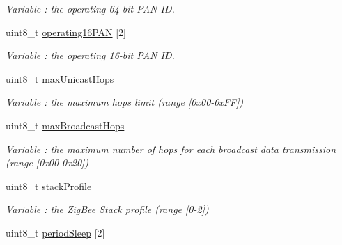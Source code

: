 \begin{DoxyCompactItemize}
\begin{DoxyCompactList}\small\item\em Variable \+: the operating 64-\/bit P\+AN ID. \end{DoxyCompactList}\item 
uint8\+\_\+t \hyperlink{class_wasp_x_bee_z_b_a0decfdb006b7e29f75a3ded83ab13ae5}{operating16\+P\+AN} \mbox{[}2\mbox{]}\hypertarget{class_wasp_x_bee_z_b_a0decfdb006b7e29f75a3ded83ab13ae5}{}\label{class_wasp_x_bee_z_b_a0decfdb006b7e29f75a3ded83ab13ae5}

\begin{DoxyCompactList}\small\item\em Variable \+: the operating 16-\/bit P\+AN ID. \end{DoxyCompactList}\item 
uint8\+\_\+t \hyperlink{class_wasp_x_bee_z_b_ab1c10f4df0c97332255921cff2fdc9b1}{max\+Unicast\+Hops}\hypertarget{class_wasp_x_bee_z_b_ab1c10f4df0c97332255921cff2fdc9b1}{}\label{class_wasp_x_bee_z_b_ab1c10f4df0c97332255921cff2fdc9b1}

\begin{DoxyCompactList}\small\item\em Variable \+: the maximum hops limit (range \mbox{[}0x00-\/0x\+FF\mbox{]}) \end{DoxyCompactList}\item 
uint8\+\_\+t \hyperlink{class_wasp_x_bee_z_b_ab61d6af1c2ccf7369189697a0d567e6a}{max\+Broadcast\+Hops}\hypertarget{class_wasp_x_bee_z_b_ab61d6af1c2ccf7369189697a0d567e6a}{}\label{class_wasp_x_bee_z_b_ab61d6af1c2ccf7369189697a0d567e6a}

\begin{DoxyCompactList}\small\item\em Variable \+: the maximum number of hops for each broadcast data transmission (range \mbox{[}0x00-\/0x20\mbox{]}) \end{DoxyCompactList}\item 
uint8\+\_\+t \hyperlink{class_wasp_x_bee_z_b_a2ac5bf30f23d32970edc8aa9432a30d5}{stack\+Profile}\hypertarget{class_wasp_x_bee_z_b_a2ac5bf30f23d32970edc8aa9432a30d5}{}\label{class_wasp_x_bee_z_b_a2ac5bf30f23d32970edc8aa9432a30d5}

\begin{DoxyCompactList}\small\item\em Variable \+: the Zig\+Bee Stack profile (range \mbox{[}0-\/2\mbox{]}) \end{DoxyCompactList}\item 
uint8\+\_\+t \hyperlink{class_wasp_x_bee_z_b_aa552043b10f91a20d7188b51f3fd90a3}{period\+Sleep} \mbox{[}2\mbox{]}\hypertarget{class_wasp_x_bee_z_b_aa552043b10f91a20d7188b51f3fd90a3}{}\label{class_wasp_x_bee_z_b_aa552043b10f91a20d7188b51f3fd90a3}


\end{DoxyCompactItemize}
